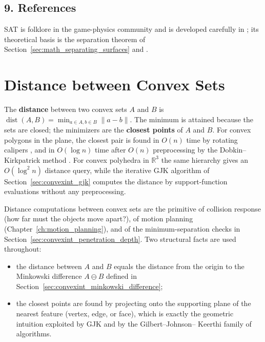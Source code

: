 \subsection{9. References}

SAT is folklore in the game-physics community and is developed carefully in
\cite{ericson2004,vandenbergen2004}; its theoretical basis is the
separation theorem of Section~\ref{sec:math_separating_surfaces} and
\cite{deberg2008}.

\section{Distance between Convex Sets}
\label{sec:convexint_distance}

The \textbf{distance} between two convex sets $A$ and $B$ is
$\operatorname{dist}(A,B) = \min_{a\in A, b\in B} \|a-b\|$. The minimum is
attained because the sets are closed; the minimizers are the \textbf{closest
points} of $A$ and $B$. For convex polygons in the plane, the closest pair
is found in $O(n)$ time by rotating calipers \cite{toussaint1983}, and in
$O(\log n)$ time after $O(n)$ preprocessing by the Dobkin--Kirkpatrick
method \cite{dobkin1985}. For convex polyhedra in $\mathbb{R}^3$ the same
hierarchy gives an $O(\log^2 n)$ distance query, while the iterative
GJK algorithm of Section~\ref{sec:convexint_gjk} computes the distance by
support-function evaluations without any preprocessing.

Distance computations between convex sets are the primitive of collision
response (how far must the objects move apart?), of motion planning
(Chapter~\ref{ch:motion_planning}), and of the minimum-separation checks in
Section~\ref{sec:convexint_penetration_depth}. Two structural facts are
used throughout:

\begin{itemize}
  \item the distance between $A$ and $B$ equals the distance from the
    origin to the Minkowski difference $A \ominus B$ defined in
    Section~\ref{sec:convexint_minkowski_difference};
  \item the closest points are found by projecting onto the supporting
    plane of the nearest feature (vertex, edge, or face), which is exactly
    the geometric intuition exploited by GJK and by the Gilbert--Johnson--
    Keerthi family of algorithms.
\end{itemize}


